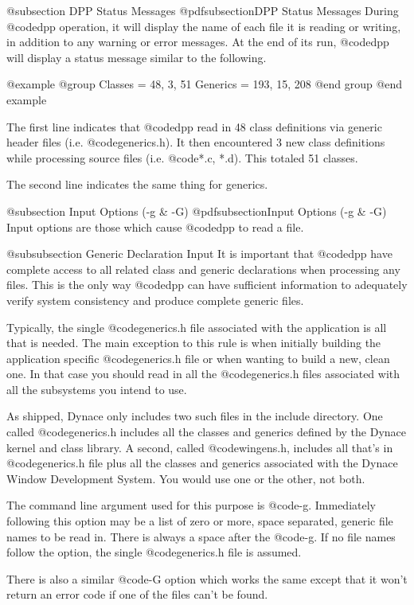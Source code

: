 @subsection DPP Status Messages
@pdfsubsection{DPP Status Messages}
During @code{dpp} operation, it will display the name of each file
it is reading or writing, in addition to any warning or error messages.
At the end of its run, @code{dpp} will display a status message similar
to the following.

@example
@group
Classes  = 48, 3, 51
Generics = 193, 15, 208
@end group
@end example

The first line indicates that @code{dpp} read in 48 class definitions
via generic header files (i.e. @code{generics.h}).  It then encountered
3 new class definitions while processing source files
(i.e. @code{*.c, *.d}).  This totaled 51 classes.

The second line indicates the same thing for generics.


@subsection Input Options (-g & -G)
@pdfsubsection{Input Options (-g & -G)}
Input options are those which cause @code{dpp} to read a file.

@subsubsection Generic Declaration Input
It is important that @code{dpp} have complete access to all related
class and generic declarations when processing any files.  This is
the only way @code{dpp} can have sufficient information to adequately
verify system consistency and produce complete generic files.

Typically, the single @code{generics.h} file associated with the application
is all that is needed.  The main exception to this rule is when initially
building the application specific @code{generics.h} file or when wanting
to build a new, clean one.  In that case you should read in all the
@code{generics.h} files associated with all the subsystems you intend
to use.

As shipped, Dynace only includes two such files in the include directory.
One called @code{generics.h} includes all the classes and generics
defined by the Dynace kernel and class library.  A second, called
@code{wingens.h}, includes all that's in @code{generics.h} file plus
all the classes and generics associated with the Dynace Window
Development System.  You would use one or the other, not both.

The command line argument used for this purpose is @code{-g}.
Immediately following this option may be a list of zero or more,
space separated, generic file names to be read in.  There is always
a space after the @code{-g}.  If no file names follow the option,
the single @code{generics.h} file is assumed.

There is also a similar @code{-G} option which works the same except
that it won't return an error code if one of the files can't be
found.


